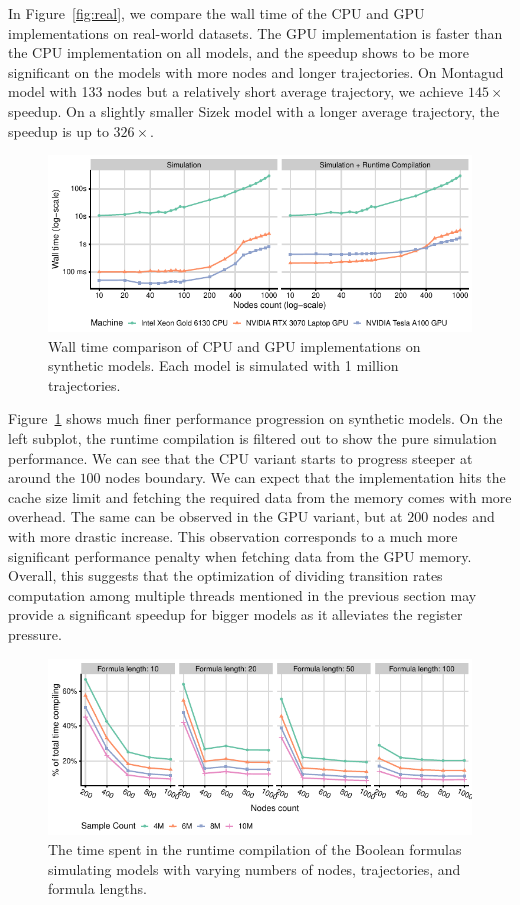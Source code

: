 \documentclass[times, twoside]{zHenriquesLab-StyleBioRxiv}
\begin{document}
In Figure~\ref{fig:real}, we compare the wall time of the CPU and GPU implementations on real-world datasets. The GPU implementation is faster than the CPU implementation on all models, and the speedup shows to be more significant on the models with more nodes and longer trajectories. On Montagud model with 133 nodes but a relatively short average trajectory, we achieve $145\times$ speedup. On a slightly smaller Sizek model with a longer average trajectory, the speedup is up to $326\times$. 

\begin{figure}
    \centering
    \includegraphics[width=\linewidth]{Figures/nodes.pdf}
    \caption{Wall time comparison of CPU and GPU implementations on synthetic models. Each model is simulated with 1 million trajectories.}
    \label{fig:synth}
\end{figure}

Figure~\ref{fig:synth} shows much finer performance progression on synthetic models. On the left subplot, the runtime compilation is filtered out to show the pure simulation performance. We can see that the CPU variant starts to progress steeper at around the $100$ nodes boundary. We can expect that the implementation hits the cache size limit and fetching the required data from the memory comes with more overhead. The same can be observed in the GPU variant, but at $200$ nodes and with more drastic increase. This observation corresponds to a much more significant performance penalty when fetching data from the GPU memory. Overall, this suggests that the optimization of dividing transition rates computation among multiple threads mentioned in the previous section may provide a significant speedup for bigger models as it alleviates the register pressure.

\begin{figure}
    \centering
    \includegraphics[width=\linewidth]{Figures/nodes-compilation-big-NVIDIA Tesla A100 GPU.pdf}
    \caption{The time spent in the runtime compilation of the Boolean formulas simulating models with varying numbers of nodes, trajectories, and formula lengths.}
    \label{fig:comp}
\end{figure}
\end{document}
